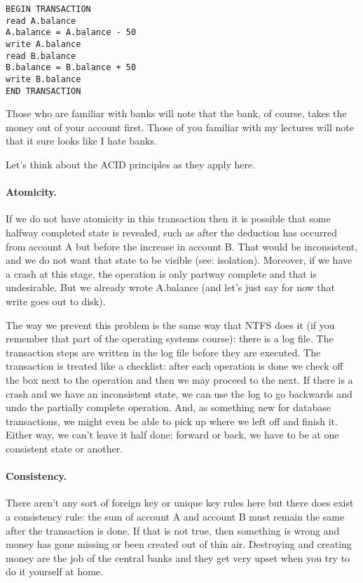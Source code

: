 \begin{verbatim}
BEGIN TRANSACTION
read A.balance
A.balance = A.balance - 50
write A.balance
read B.balance
B.balance = B.balance + 50
write B.balance
END TRANSACTION
\end{verbatim}

Those who are familiar with banks will note that the bank, of course, takes the money out of your account first. Those of you familiar with my lectures will note that it sure looks like I hate banks.

Let's think about the ACID principles as they apply here.

\paragraph{Atomicity.} If we do not have atomicity in this transaction then it is possible that some halfway completed state is revealed, such as after the deduction has occurred from account A but before the increase in account B. That would be inconsistent, and we do not want that state to be visible (see: isolation). Moreover, if we have a crash at this stage, the operation is only partway complete and that is undesirable. But we already wrote A.balance (and let's just say for now that write goes out to disk).

The way we prevent this problem is the same way that NTFS does it (if you remember that part of the operating systems course): there is a log file. The transaction steps are written in the log file before they are executed. The transaction is treated like a checklist: after each operation is done we check off the box next to the operation and then we may proceed to the next. If there is a crash and we have an inconsistent state, we can use the log to go backwards and undo the partially complete operation. And, as something new for database transactions, we might even be able to pick up where we left off and finish it. Either way, we can't leave it half done: forward or back, we have to be at one consistent state or another.


\paragraph{Consistency.} There aren't any sort of foreign key or unique key rules here but there does exist a consistency rule: the sum of account A and account B must remain the same after the transaction is done. If that is not true, then something is wrong and money has gone missing or been created out of thin air. Destroying and creating money are the job of the central banks and they get very upset when you try to do it yourself at home. 

